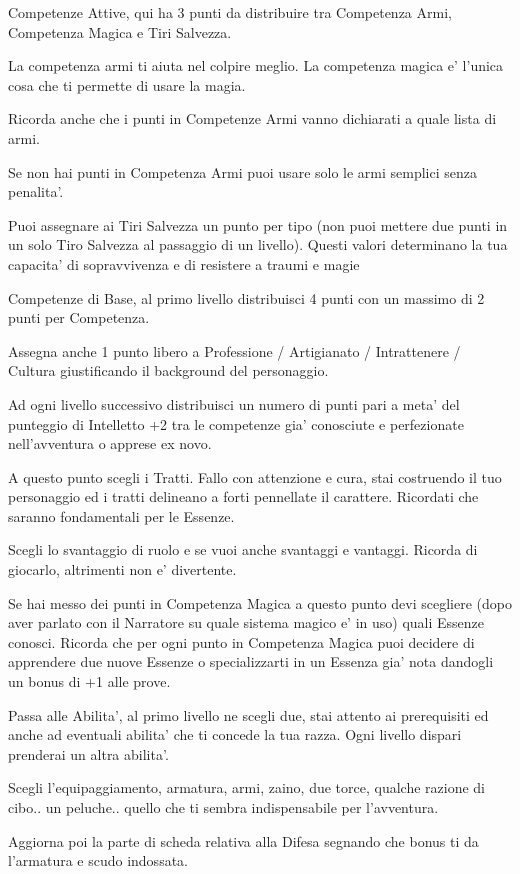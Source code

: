 \documentclass[a4paper,11pt,twoside,openany]{dndbook}
\begin{document}
Competenze Attive, qui ha 3 punti da distribuire tra Competenza Armi, Competenza Magica e Tiri Salvezza.

La competenza armi ti aiuta nel colpire meglio. La competenza magica e' l'unica cosa che ti permette di usare la magia.

Ricorda anche che i punti in Competenze Armi vanno dichiarati a quale lista di armi.

Se non hai punti in Competenza Armi puoi usare solo le armi semplici senza penalita'.

Puoi assegnare ai Tiri Salvezza un punto per tipo (non puoi mettere due punti in un solo Tiro Salvezza al passaggio di un livello). Questi valori determinano la tua capacita' di sopravvivenza e di resistere a traumi e magie

Competenze di Base, al primo livello distribuisci 4 punti con un massimo di 2 punti per Competenza.

Assegna anche 1 punto libero a Professione / Artigianato / Intrattenere / Cultura giustificando il background del personaggio.

Ad ogni livello successivo distribuisci un numero di punti pari a meta' del punteggio di Intelletto +2 tra le competenze gia' conosciute e perfezionate nell'avventura o apprese ex novo.

A questo punto scegli i Tratti. Fallo con attenzione e cura, stai costruendo il tuo personaggio ed i tratti delineano a forti pennellate il carattere. Ricordati che saranno fondamentali per le Essenze.

Scegli lo svantaggio di ruolo e se vuoi anche svantaggi e vantaggi. Ricorda di giocarlo, altrimenti non e' divertente.

Se hai messo dei punti in Competenza Magica a questo punto devi scegliere (dopo aver parlato con il Narratore su quale sistema magico e' in uso) quali Essenze conosci. Ricorda che per ogni punto in Competenza Magica puoi decidere di apprendere due nuove Essenze o specializzarti in un Essenza gia' nota dandogli un bonus di +1 alle prove.

Passa alle Abilita', al primo livello ne scegli due, stai attento ai prerequisiti ed anche ad eventuali abilita' che ti concede la tua razza. Ogni livello dispari prenderai un altra abilita'.

Scegli l'equipaggiamento, armatura, armi, zaino, due torce, qualche razione di cibo.. un peluche.. quello che ti sembra indispensabile per l'avventura.

Aggiorna poi la parte di scheda relativa alla Difesa segnando che bonus ti da l'armatura e scudo indossata.
\end{document}
